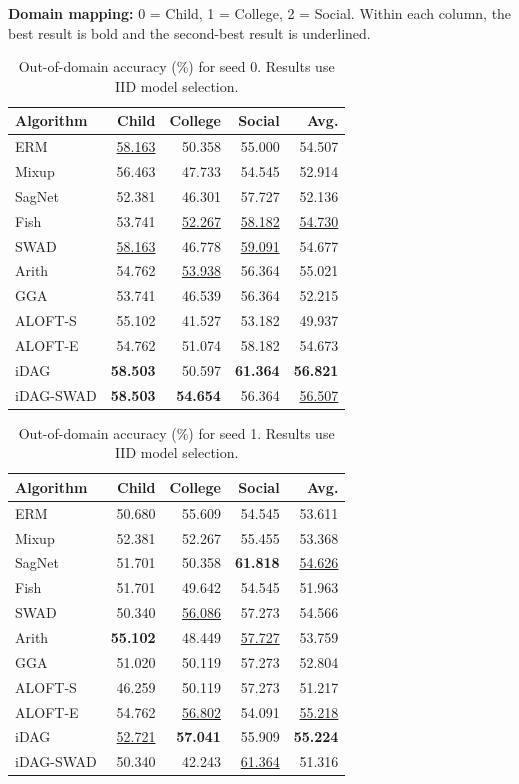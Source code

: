 \documentclass[10pt]{article}
\begin{document}
\noindent\textbf{Domain mapping:} 0 = Child, 1 = College, 2 = Social. Within each column, the best result is bold and the second-best result is underlined.
\vspace{0.7em}
\begin{table}[H]
  \centering
  \caption{Out-of-domain accuracy (\%) for seed 0. Results use IID model selection.}
  \label{tab:seed-0}
  \begin{tabular}{lrrrr}
    \toprule
    Algorithm & Child & College & Social & Avg. \\
    \midrule
    ERM & \underline{58.163} & 50.358 & 55.000 & 54.507 \\
    Mixup & 56.463 & 47.733 & 54.545 & 52.914 \\
    SagNet & 52.381 & 46.301 & 57.727 & 52.136 \\
    Fish & 53.741 & \underline{52.267} & \underline{58.182} & \underline{54.730} \\
    SWAD & \underline{58.163} & 46.778 & \underline{59.091} & 54.677 \\
    Arith & 54.762 & \underline{53.938} & 56.364 & 55.021 \\
    GGA & 53.741 & 46.539 & 56.364 & 52.215 \\
    ALOFT-S & 55.102 & 41.527 & 53.182 & 49.937 \\
    ALOFT-E & 54.762 & 51.074 & 58.182 & 54.673 \\
    iDAG & \textbf{58.503} & 50.597 & \textbf{61.364} & \textbf{56.821} \\
    iDAG-SWAD & \textbf{58.503} & \textbf{54.654} & 56.364 & \underline{56.507} \\
    \bottomrule
  \end{tabular}
\end{table}
\begin{table}[H]
  \centering
  \caption{Out-of-domain accuracy (\%) for seed 1. Results use IID model selection.}
  \label{tab:seed-1}
  \begin{tabular}{lrrrr}
    \toprule
    Algorithm & Child & College & Social & Avg. \\
    \midrule
    ERM & 50.680 & 55.609 & 54.545 & 53.611 \\
    Mixup & 52.381 & 52.267 & 55.455 & 53.368 \\
    SagNet & 51.701 & 50.358 & \textbf{61.818} & \underline{54.626} \\
    Fish & 51.701 & 49.642 & 54.545 & 51.963 \\
    SWAD & 50.340 & \underline{56.086} & 57.273 & 54.566 \\
    Arith & \textbf{55.102} & 48.449 & \underline{57.727} & 53.759 \\
    GGA & 51.020 & 50.119 & 57.273 & 52.804 \\
    ALOFT-S & 46.259 & 50.119 & 57.273 & 51.217 \\
    ALOFT-E & 54.762 & \underline{56.802} & 54.091 & \underline{55.218} \\
    iDAG & \underline{52.721} & \textbf{57.041} & 55.909 & \textbf{55.224} \\
    iDAG-SWAD & 50.340 & 42.243 & \underline{61.364} & 51.316 \\
    \bottomrule
  \end{tabular}
\end{table}
\end{document}
